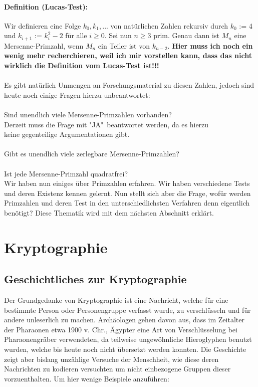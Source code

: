 \documentclass[german,12pt,a4paper]{article}
\begin{document}
\paragraph{Definition (Lucas-Test):}Wir definieren eine Folge $k_0,k_1,...$ von natürlichen Zahlen rekursiv durch $k_0$ := 4 und $k_{i+1}$ := $k_i^2-2$ für alle $i\geq 0$.
\newline Sei nun $n\geq 3$ prim. Genau dann ist $M_n$ eine Mersenne-Primzahl, wenn $M_n$ ein Teiler ist von $k_{n-2}$. \textbf{Hier muss ich noch ein wenig mehr recherchieren, weil ich mir vorstellen kann, dass das nicht wirklich die Definition vom Lucas-Test ist!!!}\\
\\Es gibt natürlich Unmengen an Forschungsmaterial zu diesen Zahlen, jedoch sind heute noch einige Fragen hierzu unbeantwortet:\\
\\Sind unendlich viele Mersenne-Primzahlen vorhanden?\\
\hspace*{15mm}Derzeit muss die Frage mit "JA"\ beantwortet werden, da es hierzu\\ 
\hspace*{15mm}keine gegenteilige Argumentationen gibt.\\
\\Gibt es unendlich viele zerlegbare Mersenne-Primzahlen?\\
\\Ist jede Mersenne-Primzahl quadratfrei?\\








Wir haben nun einiges über Primzahlen erfahren. Wir haben verschiedene Tests und deren Existenz kennen gelernt. Nun stellt sich aber die Frage, wofür werden Primzahlen und deren Test in den unterschiedlichsten Verfahren denn eigentlich benötigt? Diese Thematik wird mit dem nächsten Abschnitt erklärt. \newpage


\section{Kryptographie}

\subsection{Geschichtliches zur Kryptographie}
Der Grundgedanke von Kryptographie ist eine Nachricht, welche für eine bestimmte Person oder Personengruppe verfasst wurde, zu verschlüsseln und für andere unleserlich zu machen. Archäologen gehen davon aus, dass im Zeitalter der Pharaonen etwa 1900 v. Chr., Ägypter eine Art von Verschlüsselung bei Pharaonengräber verwendeten, da teilweise ungewöhnliche Hieroglyphen benutzt wurden, welche bis heute noch nicht übersetzt werden konnten. Die Geschichte zeigt aber bislang unzählige Versuche der Menschheit, wie diese deren Nachrichten zu kodieren versuchten um nicht einbezogene Gruppen dieser vorzuenthalten.
Um hier wenige Beispiele anzuführen:\\
\end{document}

